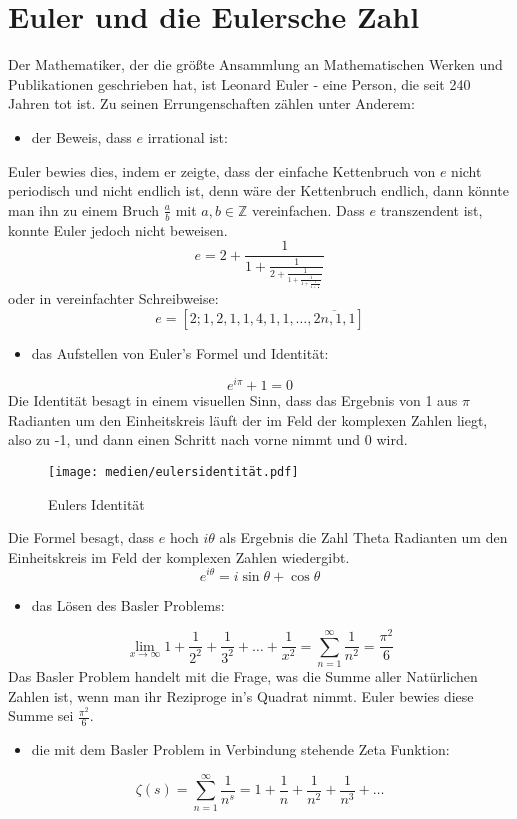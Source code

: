 \section{Euler und die Eulersche Zahl}
Der Mathematiker, der die größte Ansammlung an Mathematischen Werken und Publikationen geschrieben hat, ist Leonard Euler - eine Person, die seit 240 Jahren tot ist. Zu seinen Errungenschaften zählen unter Anderem: 
\begin{itemize}
  \item der Beweis, dass $e$ irrational ist:
\end{itemize}
Euler bewies dies, indem er zeigte, dass der einfache Kettenbruch von $e$ nicht periodisch und nicht endlich ist, denn wäre der Kettenbruch endlich, dann könnte man ihn zu einem Bruch $\frac{a}{b}$ mit $a,b \in \mathbb{Z}$ vereinfachen. Dass $e$ transzendent ist, konnte Euler jedoch nicht beweisen. \[
e = 2 +\frac{1}{1 + \frac{1}{2 + \frac{1}{1 + \frac{1}{1 + \frac{1}{4 + \frac{1}{\ddots}}}}}} \] 
oder in vereinfachter Schreibweise: \[
e = [2; 1,2,1,1,4,1,1,\dots,\overline{2n,1,1}] \]
\begin{itemize}
  \item das Aufstellen von Euler's Formel und Identität:
\end{itemize}\[
e^{i\pi} + 1 = 0 \]
Die Identität besagt in einem visuellen Sinn, dass das Ergebnis von 1 aus $\pi$ Radianten um den Einheitskreis läuft der im Feld der komplexen Zahlen liegt, also zu -1, und dann einen Schritt nach vorne nimmt und 0 wird.
\begin{figure}[h]
\texttt{[image: medien/eulersidentität.pdf]}
\centering
\caption{Eulers Identität}
\end{figure}
\newpage
\par Die Formel besagt, dass $e$ hoch $i\theta$ als Ergebnis die Zahl Theta Radianten um den Einheitskreis im Feld der komplexen Zahlen wiedergibt.
\[ e^{i\theta} = i\sin{\theta} + \cos{\theta} \] 
\begin{itemize}
  \item das Lösen des Basler Problems:
\end{itemize} \[
\lim_{x\to\infty} 1 + \frac{1}{2^2} + \frac{1}{3^2} + \dots + \frac{1}{x^2} = \sum_{n=1}^{\infty} \frac{1}{n^2} = \frac{\pi^2}{6}\]
Das Basler Problem handelt mit die Frage, was die Summe aller Natürlichen Zahlen ist, wenn man ihr Reziproge in's Quadrat nimmt. Euler bewies diese Summe sei $\frac{\pi^2}{6}$.
\begin{itemize}
  \item die mit dem Basler Problem in Verbindung stehende Zeta Funktion:
\end{itemize} \[
\zeta(s) = \sum_{n=1}^{\infty} \frac{1}{n^s} = 1 + \frac{1}{n} + \frac{1}{n^2} + \frac{1}{n^3} + \dots \]
